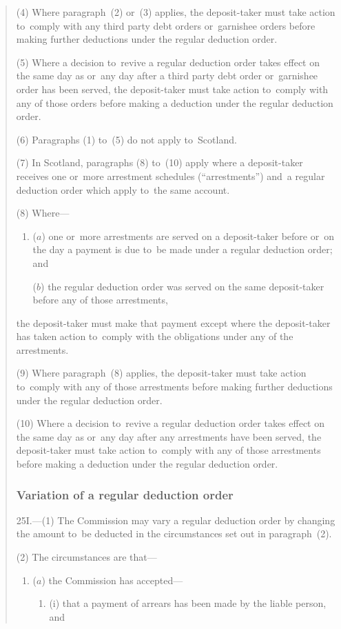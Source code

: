 \documentclass[12pt,a4paper]{article}
\begin{document}
\begin{quotation}
(4) Where paragraph~(2) or~(3) applies, the deposit-taker must take action to~comply with any third party debt orders or~garnishee orders before making further deductions under the regular deduction order.

(5) Where a decision to~revive a regular deduction order takes effect on the same day as or~any day after a third party debt order or~garnishee order has been served, the deposit-taker must take action to~comply with any of those orders before making a deduction under the regular deduction order.

(6) Paragraphs (1) to~(5) do not apply to~Scotland.

(7) In Scotland, paragraphs (8) to~(10) apply where a deposit-taker receives one or~more arrestment schedules (“arrestments”) and~a regular deduction order which apply to~the same account.

(8) Where—
\begin{enumerate}\item[]
($a$) one or~more arrestments are served on a deposit-taker before or~on the day a payment is due to~be made under a regular deduction order; and

($b$) the regular deduction order was served on the same deposit-taker before any of those arrestments,
\end{enumerate}
the deposit-taker must make that payment except where the deposit-taker has taken action to~comply with the obligations under any of the arrestments.

(9) Where paragraph~(8) applies, the deposit-taker must take action to~comply with any of those arrestments before making further deductions under the regular deduction order.

(10) Where a decision to~revive a regular deduction order takes effect on the same day as or~any day after any arrestments have been served, the deposit-taker must take action to~comply with any of those arrestments before making a deduction under the regular deduction order.

\subsubsection*{Variation of a regular deduction order}

25I.---(1)  The Commission may vary a regular deduction order by changing the amount to~be deducted in the circumstances set out in paragraph~(2).

(2) The circumstances are that—
\begin{enumerate}\item[]
($a$) the Commission has accepted—
\begin{enumerate}\item[]
(i) that a payment of arrears has been made by the liable person, and


\end{enumerate}
\end{enumerate}
\end{quotation}
\end{document}
